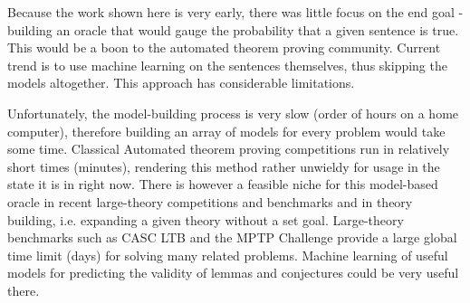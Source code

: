 Because the work shown here is very early, there was little focus on the end goal - building an oracle that would gauge the probability that a given sentence is true. This would be a boon to the automated theorem proving community. Current trend is to use machine learning on the sentences themselves, thus skipping the models altogether. This approach has considerable limitations.

Unfortunately, the model-building process is very slow (order of hours on a home computer), therefore building an array of models for every problem would take some time. Classical Automated theorem proving competitions run in relatively short times (minutes), rendering this method rather unwieldy for usage in the state it is in right now. There is however a feasible niche for this model-based oracle in recent large-theory competitions and benchmarks and in theory building, i.e. expanding a given theory without a set goal. Large-theory benchmarks such as CASC LTB and the MPTP Challenge provide a large global time limit (days) for solving many related
problems. Machine learning of useful models for predicting the
validity of lemmas and conjectures could be very useful there.